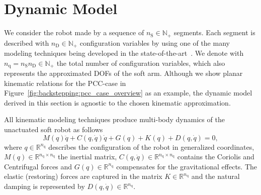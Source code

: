\section{Dynamic Model}\label{sec:backstepping:dynamic_model}

We consider the robot made by a sequence of $n_{\mathrm{S}} \in \mathbb{N}_+$ segments. Each segment is described with $n_{\mathrm{D}} \in \mathbb{N}_+$ configuration variables by using one of the many modeling techniques being developed in the state-of-the-art~\citep {faure2012sofa, grazioso2019geometrically, sadati2021tmtdyn, boyer2020dynamics}.
%
We denote with $n_{\mathrm{q}} = n_{\mathrm{S}} n_{\mathrm{D}}  \in \mathbb{N}_+$ the total number of configuration variables, which also represents the approximated \glspl{DOF} of the soft arm.
%
Although we show planar kinematic relations for the \gls{PCC}-case in Figure~\ref{fig:backstepping:pcc_case_overview} as an example, the dynamic model derived in this section is agnostic to the chosen kinematic approximation.
%

All kinematic modeling techniques produce multi-body dynamics of the unactuated soft robot as follows~\citep{della2023model}
%
\begin{equation}
	M(q)\ddot{q} + C(q,\dot{q}) \dot{q} + G(q) + K(q) + D(q, \dot{q}) = 0,
\end{equation}
%
where $q \in \mathbb{R}^{n_{\mathrm{q}}}$ describes the configuration of the robot in generalized coordinates, $M(q) \in \mathbb{R}^{n_{\mathrm{q}} \times n_{\mathrm{q}}}$ the inertial matrix, $C(q,\dot{q}) \in \mathbb{R}^{n_{\mathrm{q}} \times n_{\mathrm{q}}}$ contains the Coriolis and Centrifugal forces and $G(q) \in \mathbb{R}^{n_{\mathrm{q}}}$ compensates for the gravitational effects. The elastic (restoring) forces are captured in the matrix $K \in \mathbb{R}^{n_{\mathrm{q}}}$ and the natural damping is represented by $D(q,\dot{q}) \in \mathbb{R}^{n_{\mathrm{q}}}$.

